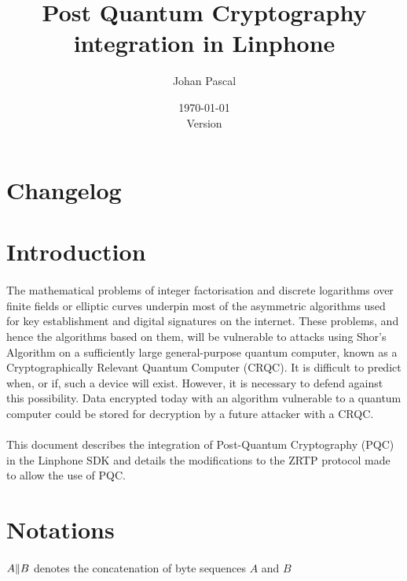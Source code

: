 \documentclass[a4paper,11pt]{article}
\title{Post Quantum Cryptography integration in Linphone}
\date{\today\\Version \currentVersion}
\author{Johan Pascal}
\def\currentVersion{1.0}
\begin{document}
\maketitle
\newpage
\tableofcontents

\newpage
\section{Changelog}
\begin{versionhistory}
\end{versionhistory}

\newpage
\section{Introduction}
\paragraph{}The mathematical problems of integer factorisation and discrete logarithms over finite fields or elliptic curves underpin most of the asymmetric algorithms used for key establishment and digital signatures on the internet.  These problems, and hence the algorithms based on them, will be vulnerable to attacks using Shor's Algorithm on a sufficiently large general-purpose quantum computer, known as a Cryptographically Relevant Quantum Computer (CRQC).  It is difficult to predict when, or if, such a device will exist.  However, it is necessary to defend against this possibility. Data encrypted today with an algorithm vulnerable to a quantum computer could be stored for decryption by a future attacker with a CRQC.\citep{driscoll-pqt-hybrid-terminology-00}

\paragraph{}This document describes the integration of Post-Quantum Cryptography (PQC) in the Linphone SDK and details the modifications to the ZRTP protocol\citep{rfc6189} made to allow the use of PQC.
\section{Notations}
\paragraph{}$A\Arrowvert B$ denotes the concatenation of byte sequences $A$ and $B$
\end{document}
